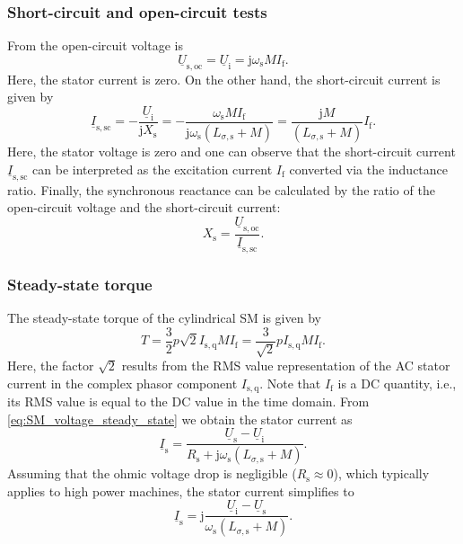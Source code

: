 \begin{frame}
	\frametitle{Short-circuit and open-circuit tests} 
	From  the open-circuit voltage is
	\begin{equation}
		\underline{U}_\mathrm{s,oc} = \underline{U}_\mathrm{i} = \mathrm{j} \omega_\mathrm{s} M I_\mathrm{f}.
	\end{equation}
	Here, the stator current is zero. \pause On the other hand, the short-circuit current is given by
	\begin{equation}
		\underline{I}_\mathrm{s,sc} = -\frac{\underline{U}_\mathrm{i}}{\mathrm{j}X_\mathrm{s}} = -\frac{\omega_\mathrm{s} M I_\mathrm{f}}{\mathrm{j}\omega_\mathrm{s}\left(L_{\sigma,\mathrm{s}} + M\right)} = \frac{\mathrm{j} M}{\left(L_{\sigma,\mathrm{s}} + M\right)}I_\mathrm{f}.
	\end{equation}
	Here, the stator voltage is zero and one can observe that the short-circuit current $\underline{I}_\mathrm{s,sc}$ can be interpreted as the excitation current $I_\mathrm{f}$ converted via the inductance ratio. \pause Finally, the synchronous reactance can be calculated by the ratio of the open-circuit voltage and the short-circuit current:
	\begin{equation}
		X_\mathrm{s} = \frac{\underline{U}_\mathrm{s,oc}}{\underline{I}_\mathrm{s,sc}}.
	\end{equation}
\end{frame}

\begin{frame}
	\frametitle{Steady-state torque} 
	The steady-state torque of the cylindrical SM is given by
	$$ T = \frac{3}{2} p \sqrt{2}I_\mathrm{s,q} M I_\mathrm{f} = \frac{3}{\sqrt{2}} p I_\mathrm{s,q} M I_\mathrm{f}.$$
	\pause
	Here, the factor $\sqrt{2}$ results from the RMS value representation of the AC stator current in the complex phasor component $I_\mathrm{s,q}$.  Note that $I_\mathrm{f}$ is a DC quantity, i.e., its RMS value is equal to the DC value in the time domain. \pause 
	From \eqref{eq:SM_voltage_steady_state} we obtain the stator current as
	\begin{equation}
	\underline{I}_\mathrm{s} = \frac{\underline{U}_\mathrm{s} - \underline{U}_\mathrm{i}}{R_\mathrm{s} + \mathrm{j}\omega_\mathrm{s} \left(L_{\sigma,\mathrm{s}} + M\right)}.
	\end{equation}
	\pause
	Assuming that the ohmic voltage drop is negligible ($R_\mathrm{s}\approx 0$), which typically applies to high power machines, the stator current simplifies to
	\begin{equation}
		\underline{I}_\mathrm{s} = \mathrm{j} \frac{\underline{U}_\mathrm{i} - \underline{U}_\mathrm{s}}{\omega_\mathrm{s} \left(L_{\sigma,\mathrm{s}} + M\right)}.
		\label{eq:SM_stator_current_steady_state}
	\end{equation}
\end{frame}

